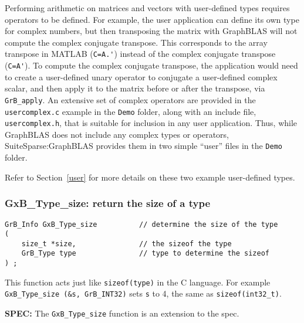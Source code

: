 \documentclass[12pt]{article}
\begin{document}
Performing arithmetic on matrices and vectors with user-defined types requires
operators to be defined.  For example, the user application can define its own
type for complex numbers, but then transposing the matrix with GraphBLAS will
not compute the complex conjugate transpose.  This corresponds to the array
transpose in MATLAB (\verb"C=A.'") instead of the complex conjugate transpose
(\verb"C=A'").  To compute the complex conjugate transpose, the application
would need to create a user-defined unary operator to conjugate a user-defined
complex scalar, and then apply it to the matrix before or after the transpose,
via \verb'GrB_apply'.  An extensive set of complex operators are provided in
the \verb'usercomplex.c' example in the \verb'Demo' folder, along with an
include file, \verb'usercomplex.h', that is suitable for inclusion in any user
application.  Thus, while GraphBLAS does not include any complex types or
operators, SuiteSparse:GraphBLAS provides them in two simple ``user'' files in
the \verb'Demo' folder.

Refer to Section~\ref{user} for more details on these two example user-defined
types.

\subsubsection{{\sf GxB\_Type\_size:} return the size of a type}
\label{type_size}

\begin{mdframed}[userdefinedwidth=6in]
{\footnotesize
\begin{verbatim}
GrB_Info GxB_Type_size          // determine the size of the type
(
    size_t *size,               // the sizeof the type
    GrB_Type type               // type to determine the sizeof
) ;
\end{verbatim}
}\end{mdframed}

This function acts just like \verb'sizeof(type)' in the C language.  For
example \verb'GxB_Type_size (&s, GrB_INT32)' sets \verb's' to 4, the same as
\verb'sizeof(int32_t)'. 

\begin{spec}
{\bf SPEC:} The \verb'GxB_Type_size' function is an extension to the spec.
\end{spec}

\newpage
\end{document}
